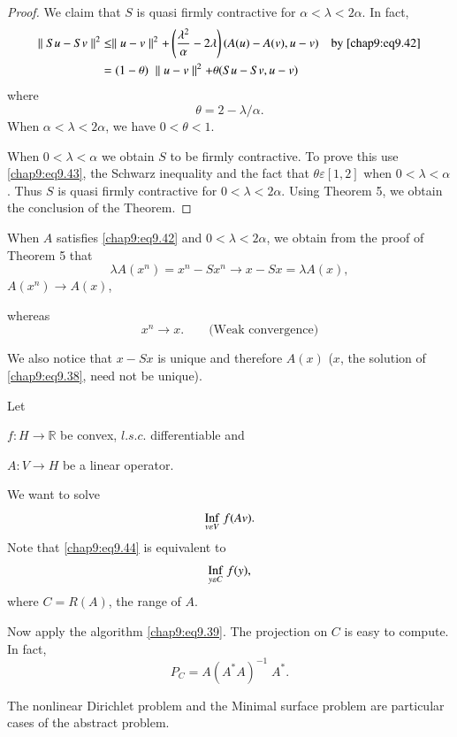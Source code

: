 \begin{proof}
We claim that $S$ is quasi firmly contractive for $\alpha <\lambda
<2\alpha$. In fact,
\begin{equation}
\begin{aligned}
\parallel Su-Sv\parallel^2 &\leq \parallel u-v\parallel^2+\left(
\frac{\lambda^2}{\alpha}-2\lambda\right)(A(u)-A(v), u-v)\quad \text{by
\eqref{chap9:eq9.42}}\\
&= (1-\theta)\;\parallel u-v\parallel^2+\theta(Su-Sv,
u-v)\label{chap9:eq9.43} 
\end{aligned}
\end{equation}
where\pageoriginale
$$
\theta =2-\lambda/\alpha.
$$
When $\alpha <\lambda < 2\alpha$, we have $0 <\theta <1$.

When $0<\lambda<\alpha$ we obtain $S$ to be firmly contractive. To
prove this use \eqref{chap9:eq9.43}, the Schwarz inequality and the
fact that $\theta \varepsilon [1,2]$ when $0<\lambda<\alpha$. Thus $S$
is quasi firmly contractive for $0<\lambda<2\alpha$. Using Theorem 5,
we obtain the conclusion of the Theorem.
\end{proof}

\begin{REM}\label{chap9:rem4}
When $A$ satisfies \eqref{chap9:eq9.42} and $0<\lambda<2\alpha$, we
obtain from the proof of Theorem 5 that 
$$
\lambda A(x^n)=x^n-Sx^n\to x-Sx=\lambda A(x),
$$
\ie \hspace{2cm} $A(x^n)\to A(x)$, \qquad {}
 
\noindent whereas
$$
x^n\rightarrow x.\qquad\text{(Weak convergence)}
$$

We also notice that $x-Sx$ is unique and therefore $A(x)$ ($x$, the
solution of \eqref{chap9:eq9.38}, need not be unique).
\end{REM}

\begin{exam}\label{chap9:exm6}
Let 

$f:H\to\mathbb{R}$ be convex, $l.s.c.$ differentiable and

$A:V\to H$ be a linear operator.

We want to solve
\begin{equation}\label{chap9:eq9.44}
\underset{v\varepsilon V}{\operatorname{Inf}} \;f(Av).
\end{equation}\pageoriginale
Note that \eqref{chap9:eq9.44} is equivalent to 
\begin{equation}\label{chap9:eq9.45}
\underset{y\varepsilon C}{\operatorname{Inf}} \;f(y),
\end{equation}
where $C=R(A)$, the range of $A$.

Now apply the algorithm \eqref{chap9:eq9.39}. The projection on $C$ is
easy to compute. In fact,
$$
P_C=A(A^*A)^{-1}\;A^*.
$$

The nonlinear Dirichlet problem and the Minimal surface problem are
particular cases of the abstract problem.
\end{exam}

